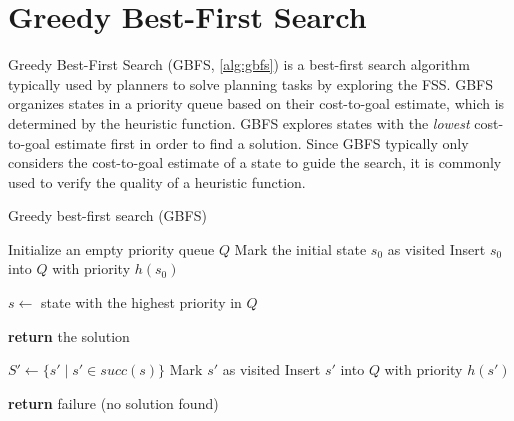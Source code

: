 \documentclass[ppgc,diss,english]{iiufrgs}
\begin{document}
\section{Greedy Best-First Search}
\label{sec:background-gbfs}
Greedy Best-First Search (GBFS, \cref{alg:gbfs}) is a best-first search algorithm typically used by planners to solve planning tasks by exploring the FSS. GBFS organizes states in a priority queue based on their cost-to-goal estimate, which is determined by the heuristic function. GBFS explores states with the \emph{lowest} cost-to-goal estimate first in order to find a solution. Since GBFS typically only considers the cost-to-goal estimate of a state to guide the search, it is commonly used to verify the quality of a heuristic function.

\begin{algorithm}[tb]
\caption{Greedy best-first search (GBFS)}
\label{alg:gbfs}
\begin{algorithmic}[1]
  \State Initialize an empty priority queue $Q$
  \State Mark the initial state $s_0$ as visited
  \State Insert $s_0$ into $Q$ with priority $h(s_0)$

    \State $s \gets$ state with the highest priority in $Q$

      \State \textbf{return} the solution
    \EndIf

    \State $S' \gets \{s' \mid s' \in succ(s)\}$
        \State Mark $s'$ as visited
        \State Insert $s'$ into $Q$ with priority $h(s')$
      \EndIf
    \EndFor
  \EndWhile

  \State \textbf{return} failure (no solution found)
\EndProcedure
\end{algorithmic}
\end{algorithm}
\end{document}
